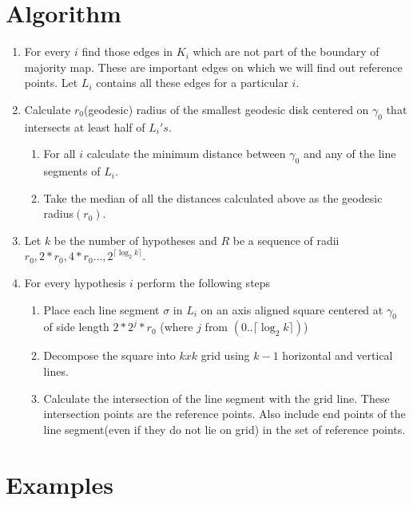 \section{Algorithm}

\begin{enumerate}
 \item For every $i$ find those edges in $K_i$ which are not part of the boundary of majority map. These are important edges on which
we will find out reference points. Let $L_i$ contains all these edges for a particular $i$.
 \item  Calculate $r_0$(geodesic) radius of the smallest geodesic disk centered on $\gamma_{0}$ that intersects at least half of $L_{i}'s$.
\begin{enumerate}
 \item For all $i$ calculate the minimum distance between $\gamma_{0}$ and any of the line segments of $L_i$.
 \item Take the median of all the distances calculated above as the geodesic radius$(r_0)$. 
\end{enumerate}
 \item Let $k$ be the number of hypotheses and $R$ be a sequence of radii $r_0,2*r_0,4*r_0 \dots , 2^{\lceil \log_{2}k \rceil}$.
 \item For every hypothesis $i$ perform the following steps
\begin{enumerate}
 \item Place each line segment $\sigma$ in $L_i$ on an axis aligned square centered at $\gamma_{0}$ of side length $2*2^{j}*r_0$ (where $j$ from $(0..\lceil \log_{2}k \rceil)$)
 \item Decompose the square into $kxk$ grid using $k-1$ horizontal and vertical lines.
 \item Calculate the intersection of the line segment with the grid line. These intersection points are the reference points. Also include 
 end points of the line segment(even if they do not lie on grid) in the set of reference points.  
\end{enumerate}

\end{enumerate}

\section{Examples}

